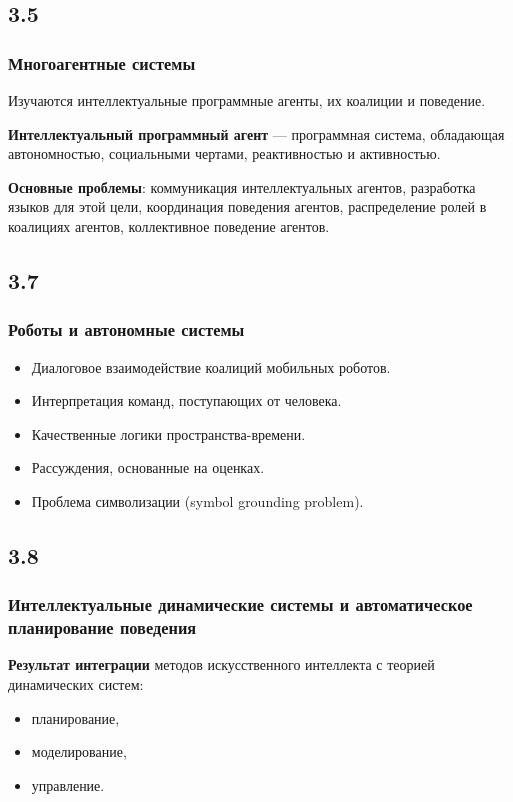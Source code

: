 \documentclass[default]{beamer}
\begin{document}
	\subsection{3.5}
	\begin{frame}
		\frametitle{Многоагентные системы}
		
		Изучаются интеллектуальные программные агенты, их коалиции и поведение.
		
		\par\medskip
		\textbf{Интеллектуальный программный  агент} --- программная система, обладающая автономностью, социальными чертами, реактивностью и активностью.
		
		\par\medskip
		\textbf{Основные проблемы}: коммуникация интеллектуальных агентов, разработка языков для этой цели, координация поведения  агентов, распределение ролей в коалициях агентов, коллективное поведение агентов.
	\end{frame}

	\subsection{3.7}
	\begin{frame}
		\frametitle{Роботы и автономные системы}
		\Large
		\begin{itemize}
			\item Диалоговое взаимодействие коалиций мобильных роботов.
			\item Интерпретация команд, поступающих от человека.
			
			\item Качественные логики пространства-времени.
			
			\item Рассуждения, основанные на оценках.
			
			\item Проблема символизации (symbol grounding problem).
		\end{itemize}
		
	\end{frame}

	\subsection{3.8}
	\begin{frame}
		\frametitle{Интеллектуальные динамические системы и автоматическое планирование поведения}
		\Large
		
		\textbf{Результат интеграции} методов искусственного интеллекта с теорией динамических систем:
		\begin{itemize}
			\item планирование,
			\item моделирование,
			\item управление.
		\end{itemize}
		
	\end{frame}
\end{document}
